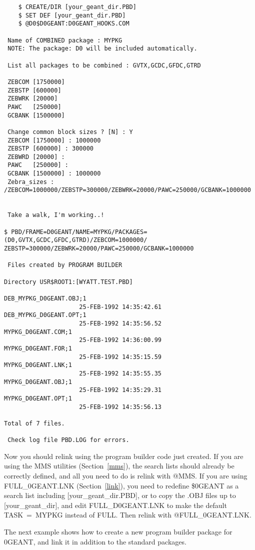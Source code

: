 \begin{verbatim}
    $ CREATE/DIR [your_geant_dir.PBD]
    $ SET DEF [your_geant_dir.PBD]
    $ @D0$D0GEANT:D0GEANT_HOOKS.COM

 Name of COMBINED package : MYPKG
 NOTE: The package: D0 will be included automatically.

 List all packages to be combined : GVTX,GCDC,GFDC,GTRD

 ZEBCOM [1750000]
 ZEBSTP [600000]
 ZEBWRK [20000]
 PAWC   [250000]
 GCBANK [1500000]

 Change common block sizes ? [N] : Y
 ZEBCOM [1750000] : 1000000
 ZEBSTP [600000] : 300000
 ZEBWRD [20000] :
 PAWC   [250000] :
 GCBANK [1500000] : 1000000
 Zebra_sizes : /ZEBCOM=1000000/ZEBSTP=300000/ZEBWRK=20000/PAWC=250000/GCBANK=1000000


 Take a walk, I'm working..!

$ PBD/FRAME=D0GEANT/NAME=MYPKG/PACKAGES=(D0,GVTX,GCDC,GFDC,GTRD)/ZEBCOM=1000000/
ZEBSTP=300000/ZEBWRK=20000/PAWC=250000/GCBANK=1000000

 Files created by PROGRAM BUILDER

Directory USR$ROOT1:[WYATT.TEST.PBD]

DEB_MYPKG_D0GEANT.OBJ;1
                     25-FEB-1992 14:35:42.61
DEB_MYPKG_D0GEANT.OPT;1
                     25-FEB-1992 14:35:56.52
MYPKG_D0GEANT.COM;1
                     25-FEB-1992 14:36:00.99
MYPKG_D0GEANT.FOR;1
                     25-FEB-1992 14:35:15.59
MYPKG_D0GEANT.LNK;1
                     25-FEB-1992 14:35:55.35
MYPKG_D0GEANT.OBJ;1
                     25-FEB-1992 14:35:29.31
MYPKG_D0GEANT.OPT;1
                     25-FEB-1992 14:35:56.13

Total of 7 files.

 Check log file PBD.LOG for errors.
\end{verbatim}

Now you should relink using the program builder code just created.  If you
are using the MMS utilities (Section~\ref{mms}), the search lists should
already be correctly defined, and all you need to do is relink with @MMS.  If
you are using FULL\_\D0GEANT.LNK (Section~\ref{link}), you need to redefine 
\$\D0GEANT as a search list including [your\_geant\_dir.PBD], or to copy the
.OBJ files up to [your\_geant\_dir], and edit FULL\_D0GEANT.LNK to make the
default TASK~=~MYPKG instead of FULL.  Then relink with 
@FULL\_\D0GEANT.LNK. 

The next example shows how to create a new program builder package for
\D0GEANT, and link it in addition to the standard packages.


